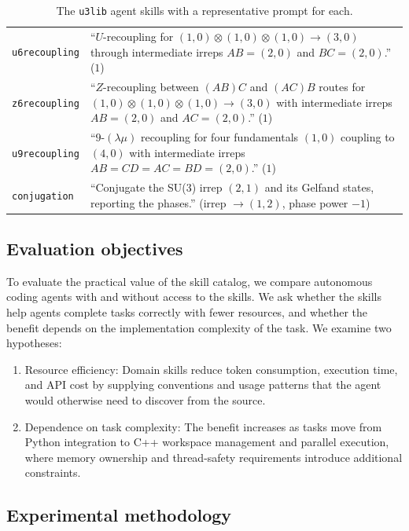 \documentclass[aps,onecolumn,10pt,superscriptaddress,floatfix,nofootinbib]{revtex4}
\begin{document}
\begin{table}[tp]
\begin{tabular}{p{3.1cm}p{13.2cm}}
    \verb|u6recoupling| & ``$U$-recoupling for $(1,0)\otimes(1,0)\otimes(1,0)\to(3,0)$ through intermediate irreps $AB=(2,0)$ and $BC=(2,0)$.'' ($1$) \\
    \verb|z6recoupling| & ``$Z$-recoupling between $(AB)C$ and $(AC)B$ routes for $(1,0)\otimes(1,0)\otimes(1,0)\to(3,0)$ with intermediate irreps $AB=(2,0)$ and $AC=(2,0)$.'' ($1$) \\
    \verb|u9recoupling| & ``$9$-$(\lambda\mu)$ recoupling for four fundamentals $(1,0)$ coupling to $(4,0)$ with intermediate irreps $AB=CD=AC=BD=(2,0)$.'' ($1$) \\
    \verb|conjugation| & ``Conjugate the SU(3) irrep $(2,1)$ and its Gelfand states, reporting the phases.'' (irrep $\to(1,2)$, phase power $-1$) \\
    \hline\hline
    \end{tabular}
    \caption{The \texttt{u3lib} agent skills with a representative prompt for each.}
    \label{tab:prompts}
\end{table}

\subsection{Evaluation objectives}
\label{app:benchmarking}
To evaluate the practical value of the skill catalog, we compare autonomous
coding agents with and without access to the skills. We ask whether the skills help agents complete tasks
correctly with fewer resources, and whether the benefit depends on the
implementation complexity of the task. We examine two hypotheses:
\begin{enumerate}
    \item {Resource efficiency:} Domain skills reduce token consumption,
    execution time, and API cost by supplying conventions and usage patterns
    that the agent would otherwise need to discover from the source.
    \item {Dependence on task complexity:} The benefit increases as tasks
    move from Python integration to C++ workspace management and parallel
    execution, where memory ownership and thread-safety requirements introduce
    additional constraints.
\end{enumerate}

\subsection{Experimental methodology}
\end{document}
